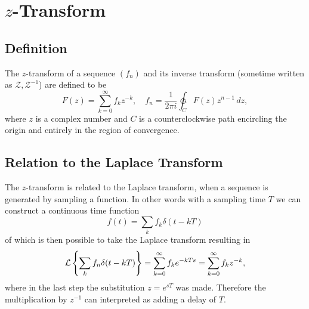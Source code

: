 
\section{\(z\)-Transform}

\subsection{Definition}

The \(z\)-transform of a sequence \((f_n)\) and its inverse transform (sometime written as \(\mathcal{Z}, \mathcal{Z}^{-1}\)) are defined to be
\[
	F(z) = \sum_{k = 0}^\infty f_k z^{-k},
	\quad
	f_n = \frac{1}{2\pi i} \ointctrclockwise_C F(z) z^{n-1} \, dz,
\]
where \(z\) is a complex number and \(C\) is a counterclockwise path encircling the origin and entirely in the region of convergence.

\subsection{Relation to the Laplace Transform}

The \(z\)-transform is related to the Laplace transform, when a sequence is generated by sampling a function. In other words with a sampling time \(T\) we can construct a continuous time function
\[
	f(t) = \sum_k f_k \delta(t - kT)
\]
of which is then possible to take the Laplace transform resulting in
\[
	\operatorname{\mathcal{L}} \left\{ \sum_k f_n \delta(t - kT) \right\}
	= \sum_{k=0}^\infty f_k e^{-kTs}
	= \sum_{k=0}^\infty f_k z^{-k},
\]
where in the last step the substitution \(z = e^{sT}\) was made. Therefore the multiplication by \(z^{-1}\) can interpreted as adding a delay of \(T\).

